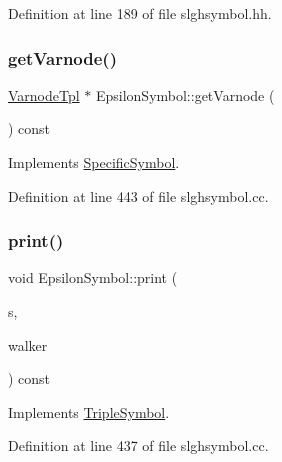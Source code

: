 Definition at line 189 of file slghsymbol.\+hh.

\mbox{\label{class_epsilon_symbol_aee856179a5dd1c4395acbeda85cb14b4}} 
\subsubsection{\texorpdfstring{getVarnode()}{getVarnode()}}
{\footnotesize\ttfamily \mbox{\hyperlink{class_varnode_tpl}{Varnode\+Tpl}} $\ast$ Epsilon\+Symbol\+::get\+Varnode (\begin{DoxyParamCaption}\item[{void}]{ }\end{DoxyParamCaption}) const\hspace{0.3cm}{\ttfamily [virtual]}}



Implements \mbox{\hyperlink{class_specific_symbol_abbde46a1f6af6c373420773d45e1e4e2}{Specific\+Symbol}}.



Definition at line 443 of file slghsymbol.\+cc.

\mbox{\label{class_epsilon_symbol_aecbc7388e707d9e11625a9b4436f73a4}} 
\subsubsection{\texorpdfstring{print()}{print()}}
{\footnotesize\ttfamily void Epsilon\+Symbol\+::print (\begin{DoxyParamCaption}\item[{ostream \&}]{s,  }\item[{\mbox{\hyperlink{class_parser_walker}{Parser\+Walker}} \&}]{walker }\end{DoxyParamCaption}) const\hspace{0.3cm}{\ttfamily [virtual]}}



Implements \mbox{\hyperlink{class_triple_symbol_a205c4487d3ad54532097dd77eb4501fc}{Triple\+Symbol}}.



Definition at line 437 of file slghsymbol.\+cc.

\mbox{\label{class_epsilon_symbol_a0ce24cb1b91e38a1c45b5ec9d6af553a}} 

